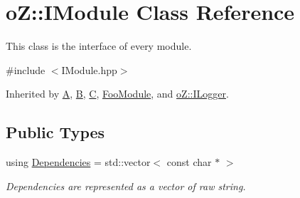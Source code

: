 \hypertarget{classo_z_1_1_i_module}{}\section{oZ\+::I\+Module Class Reference}
\label{classo_z_1_1_i_module}


This class is the interface of every module.  




{\ttfamily \#include $<$I\+Module.\+hpp$>$}



Inherited by \mbox{\hyperlink{class_a}{A}}, \mbox{\hyperlink{class_b}{B}}, \mbox{\hyperlink{class_c}{C}}, \mbox{\hyperlink{class_foo_module}{Foo\+Module}}, and \mbox{\hyperlink{classo_z_1_1_i_logger}{o\+Z\+::\+I\+Logger}}.

\subsection*{Public Types}
\begin{DoxyCompactItemize}
\item 
using \mbox{\hyperlink{classo_z_1_1_i_module_ac13210556cb2a65d186bfbe5208c666c}{Dependencies}} = std\+::vector$<$ const char $\ast$ $>$
\begin{DoxyCompactList}\small\item\em Dependencies are represented as a vector of raw string. \end{DoxyCompactList}\end{DoxyCompactItemize}
